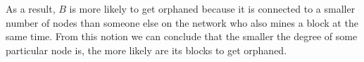 \documentclass[10pt,letter]{article}
\begin{document}
As a result, $B$ is more likely to get orphaned because it is connected to a smaller number of nodes than someone else on the network who also mines a block at the same time. From this notion we can conclude that the smaller the degree of some particular node is, the more likely are its blocks to get orphaned.
\end{document}
